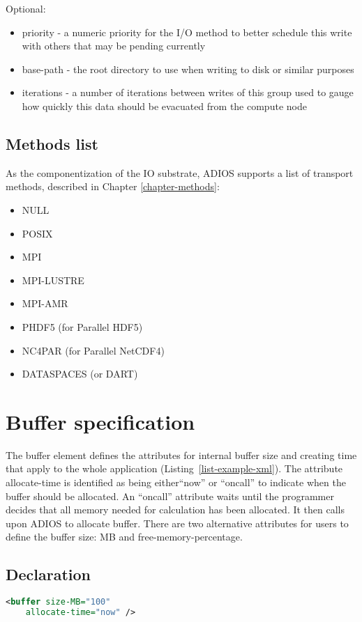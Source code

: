 Optional: 
\begin{itemize}
\item priority - a numeric priority for the I/O method to better schedule this write with 
others that may be pending currently
\item base-path - the root directory to use when writing to disk or similar purposes
\item iterations - a number of iterations between writes of this group used to gauge how 
quickly this data should be evacuated from the compute node
\end{itemize}

\subsection{Methods list}
As the componentization of the IO substrate, ADIOS supports a list of transport 
methods, described in Chapter \ref{chapter-methods}:

\begin{itemize}
\item NULL
\item POSIX
\item MPI
\item MPI-LUSTRE
\item MPI-AMR
\item PHDF5 (for Parallel HDF5)
\item NC4PAR (for Parallel NetCDF4)
\item DATASPACES (or DART)
\end{itemize}



\section{Buffer specification}
\label{section-xml-buffers-pecification}
The buffer element defines the attributes for internal buffer size and creating 
time that apply to the whole application (Listing~\ref{list-example-xml}). The attribute allocate-time 
is identified as being either{\small  ``}now'' or ``oncall'' to indicate when the 
buffer should be allocated. An ``oncall'' attribute waits until the programmer 
decides that all memory needed for calculation has been allocated. It then calls 
upon ADIOS to allocate buffer. There are two alternative attributes for users to 
define the buffer size: MB and free-memory-percentage. 

\subsection{Declaration}
\begin{lstlisting}[language=XML]
<buffer size-MB="100"
    allocate-time="now" />
\end{lstlisting}

